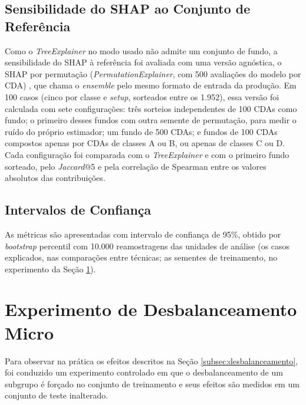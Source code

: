 \subsection{Sensibilidade do SHAP ao Conjunto de Referência}
\label{subsec:sensibilidade_fundo}

Como o \textit{TreeExplainer} no modo usado não admite um conjunto de fundo, a sensibilidade do SHAP à referência foi avaliada com uma versão agnóstica, o SHAP por permutação (\textit{PermutationExplainer}, com 500 avaliações do modelo por CDA) \cite{molnarInterpretableMachineLearning}, que chama o \textit{ensemble} pelo mesmo formato de entrada da produção. Em 100 casos (cinco por classe e \textit{setup}, sorteados entre os 1.952), essa versão foi calculada com sete configurações: três sorteios independentes de 100 CDAs como fundo; o primeiro desses fundos com outra semente de permutação, para medir o ruído do próprio estimador; um fundo de 500 CDAs; e fundos de 100 CDAs compostos apenas por CDAs de classes A ou B, ou apenas de classes C ou D. Cada configuração foi comparada com o \textit{TreeExplainer} e com o primeiro fundo sorteado, pelo \textit{Jaccard}@5 e pela correlação de Spearman entre os valores absolutos das contribuições.

\subsection{Intervalos de Confiança}

As métricas são apresentadas com intervalo de confiança de 95\%, obtido por \textit{bootstrap} percentil \cite{hastieElementsStatisticalLearning2009} com 10.000 reamostragens das unidades de análise (os casos explicados, nas comparações entre técnicas; as sementes de treinamento, no experimento da Seção \ref{sec:experimento_desbalanceamento}).

\section{Experimento de Desbalanceamento Micro}
\label{sec:experimento_desbalanceamento}

Para observar na prática os efeitos descritos na Seção \ref{subsec:desbalanceamento}, foi conduzido um experimento controlado em que o desbalanceamento de um subgrupo é forçado no conjunto de treinamento e seus efeitos são medidos em um conjunto de teste inalterado.

